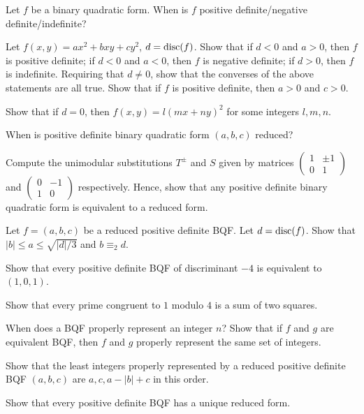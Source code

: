 \begin{question}{16}
    Let $f$ be a binary quadratic form. When is $f$ positive definite/negative definite/indefinite?

    Let $f(x,y) = ax^2 + bxy +cy^2$, $d = \text{disc}(f)$. Show that if $d < 0$ and $a > 0$, then $f$ is positive definite; if $d < 0$ and $a < 0$, then $f$ is negative definite; if $d > 0$, then $f$ is indefinite. Requiring that $d \not = 0$, show that the converses of the above statements are all true. Show that if $f$ is positive definite, then $a>0$ and $c>0$.
    
    Show that if $d = 0$, then $f(x,y) = l(mx+ny)^2$ for some integers $l,m,n$.
\end{question}

\begin{question}{17}
    When is positive definite binary quadratic form $(a,b,c)$ reduced?

    Compute the unimodular substitutions $T^\pm$ and $S$ given by matrices $\begin{pmatrix}
        1 & \pm 1 \\ 0 & 1
    \end{pmatrix}$ and    $\begin{pmatrix}
        0 & -1 \\ 1 & 0
    \end{pmatrix}$ respectively. Hence, show that any positive definite binary quadratic form is equivalent to a reduced form.
\end{question}

\begin{question}{18}
	Let $f = (a,b,c)$ be a reduced positive definite BQF. Let $d = \text{disc}(f)$. Show that $|b| \leq a \leq \sqrt{|d|/3}$ and $b \equiv_2 d$. 
	
	Show that every positive definite BQF of discriminant $-4$ is equivalent to $(1,0,1)$.
	
	Show that every prime congruent to $1$ modulo $4$ is a sum of two squares.
\end{question}


\begin{question}{19}
	When does a BQF properly represent an integer $n$? Show that if $f$ and $g$ are equivalent BQF, then $f$ and $g$ properly represent the same set of integers.
	
	Show that the least integers properly represented by a reduced positive definite BQF $(a,b,c)$ are $a,c,a-|b|+c$ in this order.
	
	Show that every positive definite BQF has a unique reduced form.
\end{question}

